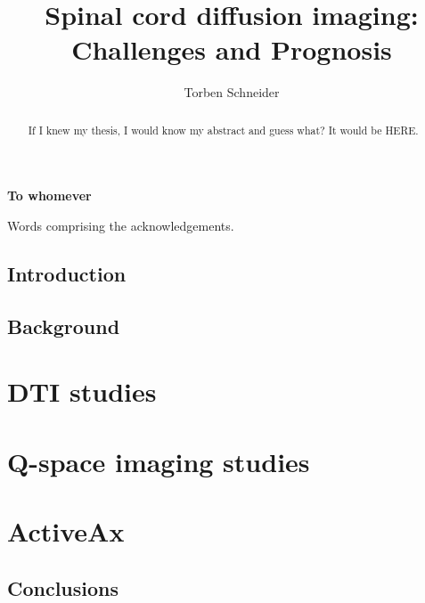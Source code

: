 \documentclass[phd,final]{ucl_thesis}
\title{Spinal cord diffusion imaging: Challenges and Prognosis}
\author{Torben Schneider}
\begin{document}
\maketitle

\clearpage

\begin{center}
\textbf{To whomever}
\end{center}

\begin{abstract}
If I knew my thesis, I would know my abstract and guess what? It
would be HERE.
\end{abstract}

\begin{acknowledgements}
Words comprising the acknowledgements.
\end{acknowledgements}

\setcounter{tocdepth}{2}
\tableofcontents
\listoffigures
\listoftables
\printglossaries



\chapter{Introduction}

\chapter{Background}

\part{DTI studies}


\part{Q-space imaging studies}


\part{ActiveAx}



\chapter{Conclusions}





%

\end{document}
